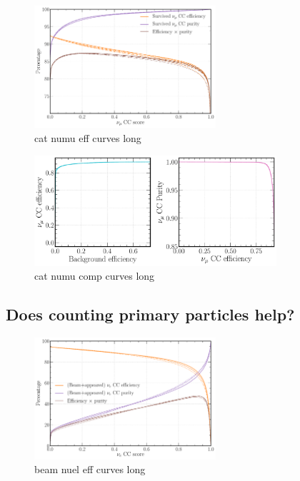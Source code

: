 \begin{figure} %
    \includegraphics[width=0.6\textwidth]{diagrams/7-cvn/chipsnet/cat_numu_eff_curves.pdf}
    \caption[cat numu eff curves short]
    {cat numu eff curves long}
    \label{fig:cat_numu_eff_curves}
\end{figure}

\begin{figure} %
    \includegraphics[width=0.8\textwidth]{diagrams/7-cvn/chipsnet/cat_numu_comp_curves.pdf}
    \caption[cat numu comp curves short]
    {cat numu comp curves long}
    \label{fig:cat_numu_comp_curves}
\end{figure}

\subsection{Does counting primary particles help?} %
\label{sec:cvn_beam_prim} %

\begin{figure} %
    \includegraphics[width=0.6\textwidth]{diagrams/7-cvn/chipsnet/beam_nuel_eff_curves.pdf}
    \caption[beam nuel eff curves short]
    {beam nuel eff curves long}
    \label{fig:beam_nuel_eff_curves}
\end{figure}

